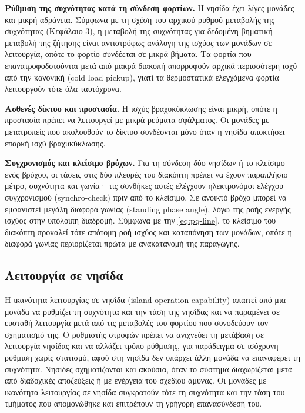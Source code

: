 \textbf{Ρύθμιση της συχνότητας κατά τη σύνδεση φορτίων.} Η νησίδα έχει λίγες μονάδες και μικρή
αδράνεια. Σύμφωνα με τη σχέση του αρχικού ρυθμού μεταβολής της συχνότητας
(\hyperref[kef-03-theoria]{Κεφάλαιο 3}), η μεταβολή της συχνότητας για δεδομένη βηματική
μεταβολή της ζήτησης είναι αντιστρόφως ανάλογη της ισχύος των μονάδων σε λειτουργία, οπότε το
φορτίο συνδέεται σε μικρά βήματα. Τα φορτία που επανατροφοδοτούνται μετά από μακρά διακοπή
απορροφούν αρχικά περισσότερη ισχύ από την κανονική (cold load pickup), γιατί τα θερμοστατικά
ελεγχόμενα φορτία λειτουργούν τότε όλα ταυτόχρονα.

\textbf{Ασθενές δίκτυο και προστασία.} Η ισχύς βραχυκύκλωσης είναι μικρή, οπότε η προστασία
πρέπει να λειτουργεί με μικρά ρεύματα σφάλματος. Οι μονάδες με
μετατροπείς που ακολουθούν το δίκτυο συνδέονται μόνο όταν η νησίδα αποκτήσει επαρκή ισχύ
βραχυκύκλωσης.

\textbf{Συγχρονισμός και κλείσιμο βρόχων.} Για τη σύνδεση δύο νησίδων ή το κλείσιμο ενός
βρόχου, οι τάσεις στις δύο πλευρές του διακόπτη πρέπει να έχουν παραπλήσιο μέτρο, συχνότητα και
γωνία· τις συνθήκες αυτές ελέγχουν ηλεκτρονόμοι ελέγχου συγχρονισμού (synchro-check) πριν από
το κλείσιμο. Σε ανοικτό βρόχο μπορεί να εμφανιστεί μεγάλη διαφορά γωνίας (standing phase
angle), λόγω της ροής ενεργής ισχύος στην υπόλοιπη διαδρομή. Σύμφωνα με την
\eqref{eq:pq-line}, το κλείσιμο του διακόπτη προκαλεί τότε απότομη ροή ισχύος και καταπόνηση
των μονάδων, οπότε η διαφορά γωνίας περιορίζεται πρώτα με ανακατανομή της παραγωγής.

\subsection{Λειτουργία σε νησίδα}
\label{sec:island}

Η ικανότητα λειτουργίας σε νησίδα (island operation capability) απαιτεί από μια μονάδα να
ρυθμίζει τη συχνότητα και την τάση της νησίδας και να παραμένει σε ευσταθή λειτουργία μετά από
τις μεταβολές του φορτίου που συνοδεύουν τον σχηματισμό της. Ο ρυθμιστής στροφών πρέπει να
ανιχνεύει τη μετάβαση σε λειτουργία νησίδας και να αλλάζει τρόπο ρύθμισης, για παράδειγμα σε
ισόχρονη ρύθμιση χωρίς στατισμό, αφού στη νησίδα δεν υπάρχει άλλη μονάδα να επαναφέρει τη
συχνότητα. Νησίδες σχηματίζονται και ακούσια, όταν το σύστημα διαχωρίζεται μετά από διαδοχικές
αποζεύξεις ή με ενέργεια του σχεδίου άμυνας. Οι μονάδες με ικανότητα λειτουργίας σε νησίδα
συγκρατούν τότε τη συχνότητα και την τάση του τμήματος που απομονώθηκε και επιτρέπουν τη
γρήγορη επανασύνδεσή του.


